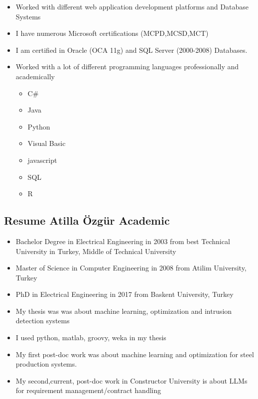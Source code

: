 \documentclass[
  letterpaper,
  DIV=11,
  numbers=noendperiod]{scrartcl}
\providecommand{\tightlist}{%
  \setlength{\itemsep}{0pt}\setlength{\parskip}{0pt}}
\begin{document}
\begin{itemize}
\tightlist
\item
  Worked with different web application development platforms and
  Database Systems
\item
  I have numerous Microsoft certifications (MCPD,MCSD,MCT)
\item
  I am certified in Oracle (OCA 11g) and SQL Server (2000-2008)
  Databases.
\item
  Worked with a lot of different programming languages professionally
  and academically

  \begin{itemize}
  \tightlist
  \item
    C\#
  \item
    Java
  \item
    Python
  \item
    Visual Basic
  \item
    javascript
  \item
    SQL
  \item
    R
  \end{itemize}
\end{itemize}

\subsection{Resume Atilla Özgür
Academic}\label{resume-atilla-uxf6zguxfcr-academic}

\begin{itemize}
\tightlist
\item
  Bachelor Degree in Electrical Engineering in 2003 from best Technical
  University in Turkey, Middle of Technical University
\item
  Master of Science in Computer Engineering in 2008 from Atilim
  University, Turkey
\item
  PhD in Electrical Engineering in 2017 from Baskent University, Turkey
\item
  My thesis was was about machine learning, optimization and intrusion
  detection systems
\item
  I used python, matlab, groovy, weka in my thesis
\item
  My first post-doc work was about machine learning and optimization for
  steel production systems.
\item
  My second,current, post-doc work in Constructor University is about
  LLMs for requirement management/contract handling
\end{itemize}
\end{document}
